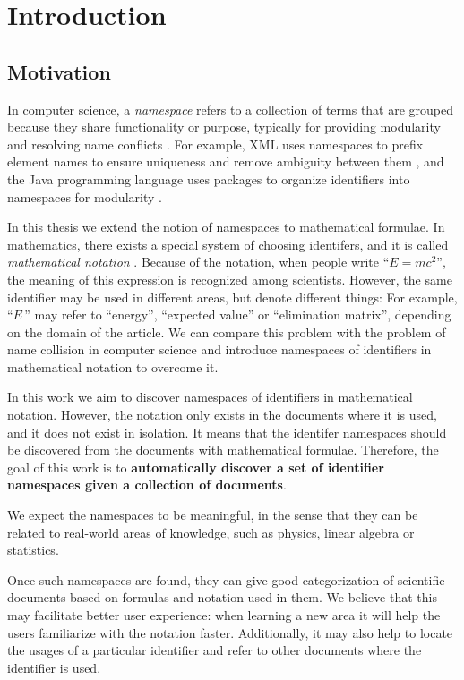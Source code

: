\section{Introduction}

\subsection{Motivation}

In computer science, a \emph{namespace} refers to a collection of terms
that are grouped because they share functionality or purpose,
typically for providing modularity and resolving name conflicts \cite{duval2002metadata}.
For example, XML uses namespaces to prefix element names to ensure uniqueness and remove ambiguity between them \cite{xmlnamespaces}, and the Java programming language uses packages to organize identifiers into namespaces for modularity \cite{gosling2014java}.

In this thesis we extend the notion of namespaces to mathematical formulae. 
In mathematics, there exists a special system of choosing identifers, and it is called 
\emph{mathematical notation} \cite{wikinotation}. Because of the notation, 
when people write ``$E=mc^2$'', the meaning of this expression is recognized among scientists. 
However, the same identifier may be used in different areas, but denote 
different things: For example, ``$E$\,'' may refer to ``energy'', ``expected value'' or 
``elimination matrix'', depending on the domain of the article.
We can compare this problem with the problem of name collision in computer science 
and introduce namespaces of identifiers in mathematical notation to overcome it. 

In this work we aim to discover namespaces of identifiers in mathematical notation. 
However, the notation only exists in the documents where it is used, and it does 
not exist in isolation. 
It means that the identifer namespaces should be discovered from the documents 
with mathematical formulae. 
Therefore, the goal of this work is to \textbf{automatically discover a set of identifier
namespaces given a collection of documents}.


We expect the namespaces to be meaningful, in the sense that they can be related to real-world areas of knowledge, such as physics, linear algebra or statistics.

Once such namespaces are found, they can give good categorization of scientific 
documents based on formulas and notation used in them. We believe that this may 
facilitate better user experience: when learning a new area it will help the users 
familiarize with the notation faster.
Additionally, it may also help to locate the usages of a particular identifier and 
refer to other documents where the identifier is used. 

